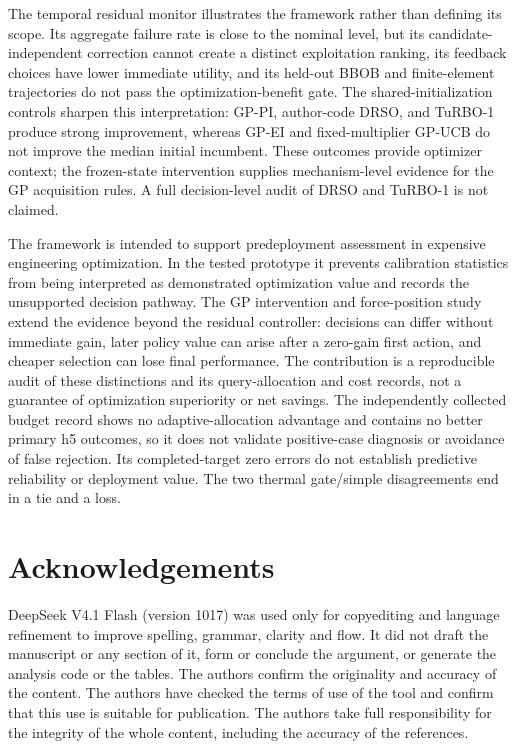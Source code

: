 \documentclass[]{interact}
\begin{document}
The temporal residual monitor illustrates the framework rather than defining its scope. Its aggregate failure rate is close to the nominal level, but its candidate-independent correction cannot create a distinct exploitation ranking, its feedback choices have lower immediate utility, and its held-out BBOB and finite-element trajectories do not pass the optimization-benefit gate. The shared-initialization controls sharpen this interpretation: GP-PI, author-code DRSO, and TuRBO-1 produce strong improvement, whereas GP-EI and fixed-multiplier GP-UCB do not improve the median initial incumbent. These outcomes provide optimizer context; the frozen-state intervention supplies mechanism-level evidence for the GP acquisition rules. A full decision-level audit of DRSO and TuRBO-1 is not claimed.

The framework is intended to support predeployment assessment in expensive engineering optimization. In the tested prototype it prevents calibration statistics from being interpreted as demonstrated optimization value and records the unsupported decision pathway. The GP intervention and force-position study extend the evidence beyond the residual controller: decisions can differ without immediate gain, later policy value can arise after a zero-gain first action, and cheaper selection can lose final performance. The contribution is a reproducible audit of these distinctions and its query-allocation and cost records, not a guarantee of optimization superiority or net savings. The independently collected budget record shows no adaptive-allocation advantage and contains no better primary h5 outcomes, so it does not validate positive-case diagnosis or avoidance of false rejection. Its completed-target zero errors do not establish predictive reliability or deployment value. The two thermal gate/simple disagreements end in a tie and a loss.

\section*{Acknowledgements}

DeepSeek V4.1 Flash (version 1017) was used only for copyediting and language refinement to improve spelling, grammar, clarity and flow. It did not draft the manuscript or any section of it, form or conclude the argument, or generate the analysis code or the tables. The authors confirm the originality and accuracy of the content. The authors have checked the terms of use of the tool and confirm that this use is suitable for publication. The authors take full responsibility for the integrity of the whole content, including the accuracy of the references.
\end{document}
